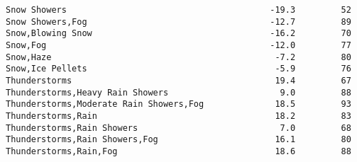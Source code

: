 \documentclass[11pt]{article}
\begin{document}
\begin{tcolorbox}[breakable, size=fbox, boxrule=.5pt, pad at break*=1mm, opacityfill=0]
\begin{Verbatim}[commandchars=\\\{\}]
Snow Showers                                        -19.3         52
Snow Showers,Fog                                    -12.7         89
Snow,Blowing Snow                                   -16.2         70
Snow,Fog                                            -12.0         77
Snow,Haze                                            -7.2         80
Snow,Ice Pellets                                     -5.9         76
Thunderstorms                                        19.4         67
Thunderstorms,Heavy Rain Showers                      9.0         88
Thunderstorms,Moderate Rain Showers,Fog              18.5         93
Thunderstorms,Rain                                   18.2         83
Thunderstorms,Rain Showers                            7.0         68
Thunderstorms,Rain Showers,Fog                       16.1         80
Thunderstorms,Rain,Fog                               18.6         88


\end{Verbatim}
\end{tcolorbox}
\end{document}
